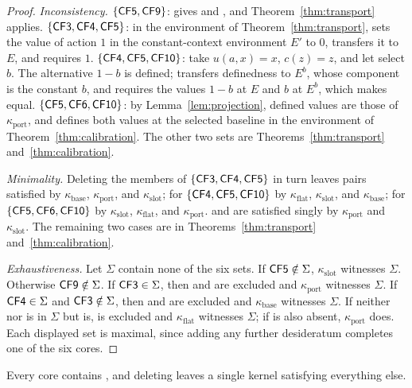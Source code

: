 \begin{proof}
\emph{Inconsistency.} $\{\textup{\textsf{CF5}},\textup{\textsf{CF9}}\}$:  gives  and , and
Theorem~\ref{thm:transport} applies. $\{\textup{\textsf{CF3}},\textup{\textsf{CF4}},\textup{\textsf{CF5}}\}$: in the environment of
Theorem~\ref{thm:transport},  sets the value of action $1$ in the constant-context environment
$E'$ to $0$,  transfers it to $E$, and  requires $1$. $\{\textup{\textsf{CF4}},\textup{\textsf{CF5}},\textup{\textsf{CF10}}\}$:
take $u(a,x)=x$, $c(z)=z$, and let  select $b$. The alternative $1-b$ is defined; 
transfers definedness to $E^b$, whose component is the constant $b$, and  requires the values
$1-b$ at $E$ and $b$ at $E^b$, which  makes equal. $\{\textup{\textsf{CF5}},\textup{\textsf{CF6}},\textup{\textsf{CF10}}\}$: by
Lemma~\ref{lem:projection}, defined values are those of $\kappa_{\mathrm{port}}$, and  defines
both values at the selected baseline in the environment of Theorem~\ref{thm:calibration}. The other two
sets are Theorems~\ref{thm:transport} and~\ref{thm:calibration}.

\emph{Minimality.} Deleting the members of $\{\textup{\textsf{CF3}},\textup{\textsf{CF4}},\textup{\textsf{CF5}}\}$ in turn leaves pairs
satisfied by $\kappa_{\mathrm{base}}$, $\kappa_{\mathrm{port}}$, and $\kappa_{\mathrm{slot}}$; for
$\{\textup{\textsf{CF4}},\textup{\textsf{CF5}},\textup{\textsf{CF10}}\}$ by $\kappa_{\mathrm{flat}}$, $\kappa_{\mathrm{slot}}$, and
$\kappa_{\mathrm{base}}$; for $\{\textup{\textsf{CF5}},\textup{\textsf{CF6}},\textup{\textsf{CF10}}\}$ by $\kappa_{\mathrm{slot}}$,
$\kappa_{\mathrm{flat}}$, and $\kappa_{\mathrm{port}}$.  and  are satisfied singly by
$\kappa_{\mathrm{port}}$ and $\kappa_{\mathrm{slot}}$. The remaining two cases are in
Theorems~\ref{thm:transport} and~\ref{thm:calibration}.

\emph{Exhaustiveness.} Let $\Sigma$ contain none of the six sets. If $\textup{\textsf{CF5}}\notin\Sigma$,
$\kappa_{\mathrm{slot}}$ witnesses $\Sigma$. Otherwise $\textup{\textsf{CF9}}\notin\Sigma$. If $\textup{\textsf{CF3}}\in\Sigma$, then
 and  are excluded and $\kappa_{\mathrm{port}}$ witnesses $\Sigma$. If $\textup{\textsf{CF4}}\in\Sigma$ and
$\textup{\textsf{CF3}}\notin\Sigma$, then  and  are excluded and $\kappa_{\mathrm{base}}$ witnesses
$\Sigma$. If neither  nor  is in $\Sigma$ but  is,  is excluded and
$\kappa_{\mathrm{flat}}$ witnesses $\Sigma$; if  is also absent, $\kappa_{\mathrm{port}}$ does.
Each displayed set is maximal, since adding any further desideratum completes one of the six cores.
\end{proof}

Every core contains , and deleting  leaves a single kernel satisfying everything else.

